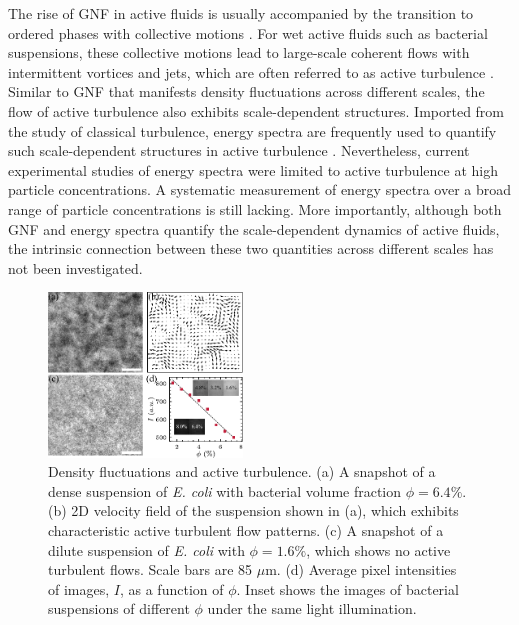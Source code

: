 \documentclass[twocolumn,aps,prx,amsmath,amssymb,longbibliography,superscriptaddress]{revtex4-2}
\begin{document}
The rise of GNF in active fluids is usually accompanied by the transition to ordered phases with collective motions \cite{Ramaswamy2010,Marchetti2013}. For wet active fluids such as bacterial suspensions, these collective motions lead to large-scale coherent flows with intermittent vortices and jets, which are often referred to as active turbulence \cite{Wolgemuth2008,Wensink2012,Dunkel2013a,Bratanov2015,Guo2018,Linkmann2019,Bardfalvy2019,Alert2020,Skultety2020,Peng2020}. Similar to GNF that manifests density fluctuations across different scales, the flow of active turbulence also exhibits scale-dependent structures. Imported from the study of classical turbulence, energy spectra are frequently used to quantify such scale-dependent structures in active turbulence \cite{Ishikawa2011,Wensink2012,Dunkel2013a,Giomi2015,Creppy2015,Patteson2018,Alert2020}. Nevertheless, current experimental studies of energy spectra were limited to active turbulence at high particle concentrations. A systematic measurement of energy spectra over a broad range of particle concentrations is still lacking. More importantly, although both GNF and energy spectra quantify the scale-dependent dynamics of active fluids, the intrinsic connection between these two quantities across different scales has not been investigated.

%
\begin{figure}[t]
	\begin{center}
		\includegraphics[width=0.46\textwidth]{Figures/fig-1.pdf}
		\caption[Experimental details]
		{Density fluctuations and active turbulence.
			(a) A snapshot of a dense suspension of \textit{E. coli} with bacterial volume fraction $\phi = 6.4\%$.
			(b) 2D velocity field of the suspension shown in (a), which exhibits characteristic active turbulent flow patterns.
			(c) A snapshot of a dilute suspension of \textit{E. coli} with $\phi = 1.6\%$, which shows no active turbulent flows. Scale bars are 85 $\mu$m.
			(d) Average pixel intensities of images, $I$, as a function of $\phi$. Inset shows the images of bacterial suspensions of different $\phi$ under the same light illumination.
		}
		\label{fig:experiment}
	\end{center}
\end{figure}
%
\end{document}
